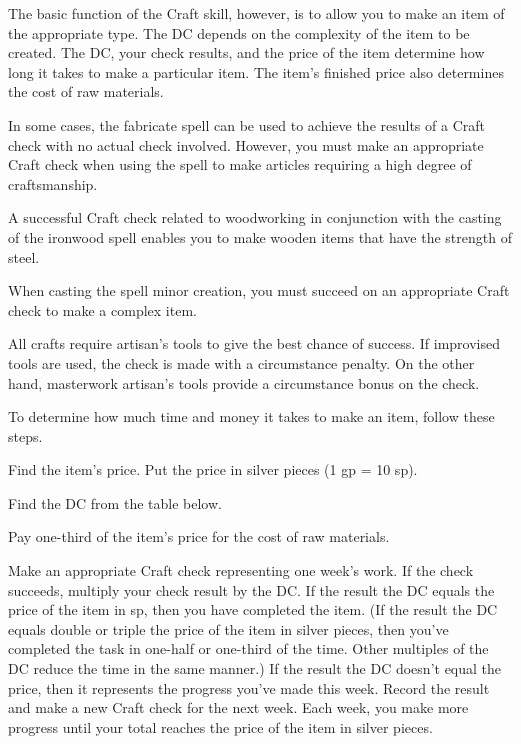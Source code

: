 The basic function of the Craft skill, however, is to allow you to make an item of the appropriate type. The DC depends on the complexity of the item to be created. The DC, your check results, and the price of the item determine how long it takes to make a particular item. The item's finished price also determines the cost of raw materials.

In some cases, the fabricate spell can be used to achieve the results of a Craft check with no actual check involved. However, you must make an appropriate Craft check when using the spell to make articles requiring a high degree of craftsmanship.

A successful Craft check related to woodworking in conjunction with the casting of the ironwood spell enables you to make wooden items that have the strength of steel.

When casting the spell minor creation, you must succeed on an appropriate Craft check to make a complex item.

All crafts require artisan's tools to give the best chance of success. If improvised tools are used, the check is made with a  circumstance penalty. On the other hand, masterwork artisan's tools provide a  circumstance bonus on the check.

To determine how much time and money it takes to make an item, follow these steps.
\begin{enumerate*}
\item Find the item's price. Put the price in silver pieces (1 gp = 10 sp).
\item Find the DC from the table below.
\item Pay one-third of the item's price for the cost of raw materials.
\item Make an appropriate Craft check representing one week's work. If the check succeeds, multiply your check result by the DC. If the result \mtimes the DC equals the price of the item in sp, then you have completed the item. (If the result \mtimes the DC equals double or triple the price of the item in silver pieces, then you've completed the task in one-half or one-third of the time. Other multiples of the DC reduce the time in the same manner.) If the result \mtimes the DC doesn't equal the price, then it represents the progress you've made this week. Record the result and make a new Craft check for the next week. Each week, you make more progress until your total reaches the price of the item in silver pieces.

\end{enumerate*}

